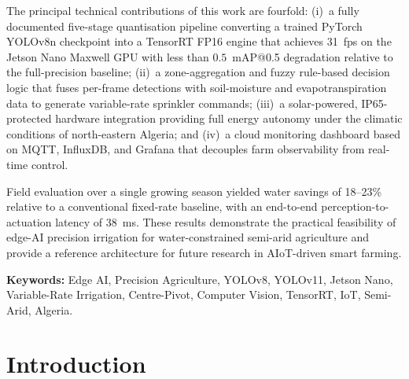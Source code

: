 \documentclass[12pt,a4paper]{report}
\begin{document}
The principal technical contributions of this work are fourfold: (i)~a fully documented five-stage quantisation pipeline converting a trained PyTorch YOLOv8n checkpoint into a TensorRT FP16 engine that achieves 31~fps on the Jetson Nano Maxwell GPU with less than $0.5$~mAP@0.5 degradation relative to the full-precision baseline; (ii)~a zone-aggregation and fuzzy rule-based decision logic that fuses per-frame detections with soil-moisture and evapotranspiration data to generate variable-rate sprinkler commands; (iii)~a solar-powered, IP65-protected hardware integration providing full energy autonomy under the climatic conditions of north-eastern Algeria; and (iv)~a cloud monitoring dashboard based on MQTT, InfluxDB, and Grafana that decouples farm observability from real-time control.

Field evaluation over a single growing season yielded water savings of 18--23\% relative to a conventional fixed-rate baseline, with an end-to-end perception-to-actuation latency of 38~ms. These results demonstrate the practical feasibility of edge-AI precision irrigation for water-constrained semi-arid agriculture and provide a reference architecture for future research in AIoT-driven smart farming.

\vspace{6pt}
\noindent\textbf{Keywords:} Edge AI, Precision Agriculture, YOLOv8, YOLOv11, Jetson Nano, Variable-Rate Irrigation, Centre-Pivot, Computer Vision, TensorRT, IoT, Semi-Arid, Algeria.

\newpage

\renewcommand{\contentsname}{Table of Contents}
{}
\tableofcontents
\newpage
{}
{}
\listoffigures
\newpage
{}
{}
\listoftables
\newpage
{}
\setcounter{page}{1}

\chapter{Introduction}
\pagestyle{fancy}
\thispagestyle{empty}
\end{document}
